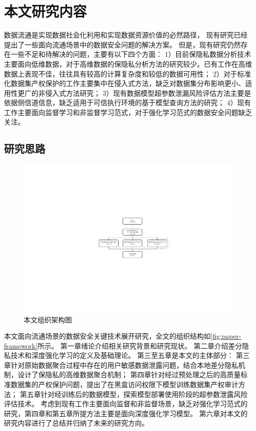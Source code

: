 \section{本文研究内容}
数据流通是实现数据社会化利用和实现数据资源价值的必然路径，
现有研究已经提出了一些面向流通场景中的数据安全问题的解决方案。
但是，现有研究仍然存在一些不足和待解决的问题，主要有以下四个方面：
1）目前保隐私数据分析技术主要面向低维数据，对于高维数据的保隐私分析方法的研究较少。已有工作在高维数据上表现不佳，往往具有较高的计算复杂度和较低的数据可用性；
2）对于标准化数据集产权保护的工作主要集中在侵入式方法，缺乏对数据集分布影响更小、适用性更广的非侵入式方法研究；
3）现有数据模型超参数泄漏风险评估方法主要是依据侧信道信息，缺乏适用于可信执行环境的基于模型查询方法的研究；
4）现有工作主要面向监督学习和非监督学习范式，对于强化学习范式的数据安全问题缺乏关注。

\subsection{研究思路}
\begin{figure}[h]
    \centering
    \includegraphics[width=0.75\hsize]{figure/others/全文框架5.pdf}
    \caption{本文组织架构图} 
    \label{fig:paper-framework}
\end{figure}
本文面向流通场景的数据安全关键技术展开研究，全文的组织结构如\autoref{fig:paper-framework}所示。
第一章绪论介绍相关研究背景和研究现状。
第二章介绍差分隐私技术和深度强化学习的定义及基础理论。
第三至五章是本文的主体部分：
第三章针对原始数据聚合过程中存在的用户敏感数据泄露问题，结合本地差分隐私机制，设计了保隐私的高维数据聚合机制；
第四章针对经过预处理之后的高质量标准数据集的产权保护问题，提出了在黑盒访问权限下模型训练数据集产权审计方法；
第五章针对经训练后的数据模型，探索模型部署使用阶段的超参数泄露风险评估技术。
考虑到现有工作主要面向监督和非监督场景，缺乏对强化学习范式的研究，第四章和第五章所提方法主要是面向深度强化学习模型。
第六章对本文的研究内容进行了总结并归纳了未来的研究方向。

